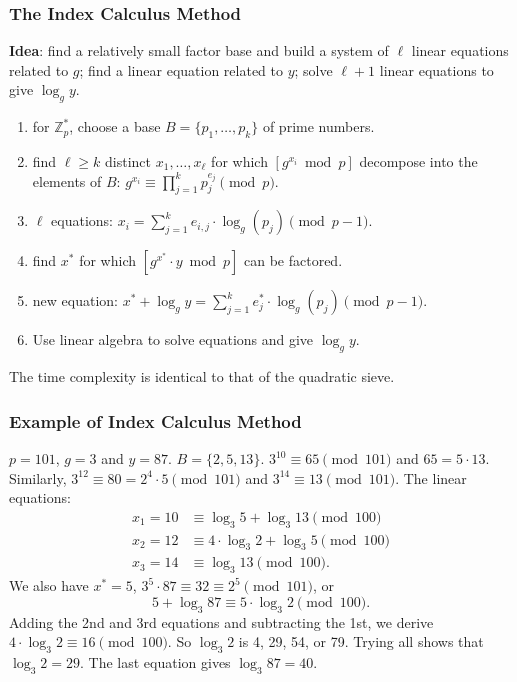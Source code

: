 \begin{frame}\frametitle{The Index Calculus Method}
\textbf{Idea}: find a relatively small factor base and build a system of $\ell$ linear equations related to $g$; find a linear equation related to $y$; solve $\ell+1$ linear equations to give $\log_g y$.
\begin{enumerate}
\item for $\mathbb{Z}^*_p$, choose a base $B = \{p_1,\dotsc,p_k\}$ of prime numbers. 
\item find $\ell \ge k$ distinct $x_1,\dotsc,x_\ell$ for which $[g^{x_i} \bmod p]$ decompose into the elements of $B$: $g^{x_i} \equiv \prod^k_{j=1} p_j^{e_j} \pmod p$.
\item $\ell$ equations: $x_i = \sum^k_{j=1}e_{i,j}\cdot \log_g(p_{j}) \pmod{p-1}$.
\item find $x^*$ for which $[g^{x^*}\cdot y \bmod p]$ can be factored.
\item new equation: $x^* + \log_gy = \sum^k_{j=1}e^*_{j}\cdot \log_g(p_j) \pmod{p-1}$.
\item Use linear algebra to solve equations and give $\log_gy$.  
\end{enumerate}
The time complexity is identical to that of the quadratic sieve.
\end{frame}
\begin{frame}\frametitle{Example of Index Calculus Method}
\begin{exampleblock}{$p=101$, $g=3$ and $y=87$. $B=\{2,5,13\}$.}
$3^{10} \equiv 65 \pmod {101}$ and $65 = 5\cdot 13$. Similarly, $3^{12} \equiv 80  = 2^4 \cdot 5 \pmod {101}$ and $3^{14} \equiv 13 \pmod {101}$. The linear equations:
\begin{align*}
x_1 = 10 &\equiv \log_3 5 + \log_3 13 \pmod{100}\\
x_2 = 12 &\equiv 4\cdot \log_3 2 + \log_3 5 \pmod{100}\\
x_3 = 14 &\equiv \log_3 13 \pmod{100}.
\end{align*}
We also have $x^*=5$, $3^5\cdot 87 \equiv 32 \equiv 2^5 \pmod{101}$, or
\[5+\log_3 87 \equiv 5\cdot \log_3 2 \pmod{100}.\]
Adding the 2nd and 3rd equations and subtracting the 1st, we derive $4\cdot \log_3 2 \equiv 16 \pmod{100}$. So $\log_3 2$ is 4, 29, 54, or 79. Trying all shows that $\log_3 2 = 29$. The last equation gives $\log_3 87 = 40$.
\end{exampleblock}
\end{frame}
